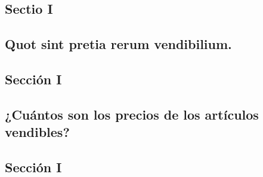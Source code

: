 \documentclass{article}
\begin{document}
\begin{paracol}{3}
\begin{nthcolumn*}{0}
    \subsection*{\centering Sectio I}
    \subsection*{\centering Quot sint pretia rerum vendibilium.} 
  \end{nthcolumn*}
  \vspace{0.5cm}
  \begin{nthcolumn}{1} %
    \subsection*{\centering Sección I}
    \subsection*{\centering ¿Cuántos son los precios de los artículos vendibles?}
  \end{nthcolumn}
  \vspace{0.5cm}
  \begin{nthcolumn}{2} %
    \subsection*{\centering Sección I}

\end{nthcolumn}
\end{paracol}
\end{document}
